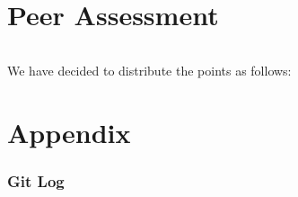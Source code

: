\documentclass[a4paper,11pt,titlepage]{article}
\begin{document}
\part{Peer Assessment}
\paragraph{}
We have decided to distribute the points as follows:

\part{Appendix}
\section{Git Log}



\newpage


\end{document}
